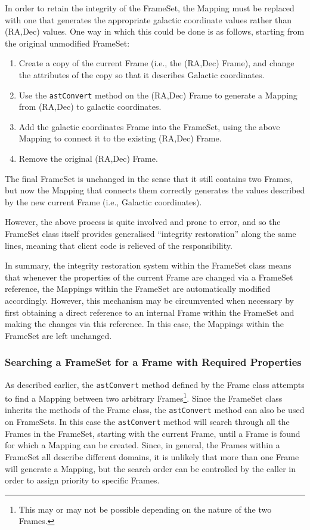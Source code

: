 \documentclass[final,authoryear,5p,times,twocolumn]{elsarticle}
\begin{document}
In order to retain the integrity of the FrameSet, the Mapping must
be replaced with one that generates the appropriate galactic coordinate
values rather than (RA,Dec) values. One way in which this could be done is as
follows, starting from the original unmodified FrameSet:

\begin{enumerate}
\item Create a copy of the current Frame (i.e., the (RA,Dec) Frame), and
change the attributes of the copy so that it describes Galactic
coordinates.
\item Use the \texttt{astConvert} method on the (RA,Dec) Frame to generate a
Mapping from (RA,Dec) to galactic coordinates.
\item Add the galactic coordinates Frame into the FrameSet, using the
above Mapping to connect it to the existing (RA,Dec) Frame.
\item Remove the original (RA,Dec) Frame.
\end{enumerate}

The final FrameSet is unchanged in the sense that it still contains two
Frames, but now the Mapping that connects them correctly generates the values
described by the new current Frame (i.e., Galactic coordinates).

However, the above process is quite involved and prone to error, and so
the FrameSet class itself provides generalised ``integrity restoration''
along the same lines, meaning that client code is relieved of the
responsibility.

In summary, the integrity restoration system within the FrameSet class
means that whenever the properties of the current Frame are changed via a
FrameSet reference, the Mappings within the FrameSet are automatically
modified accordingly. However, this mechanism may be circumvented when
necessary by first obtaining a direct reference to an internal Frame
within the FrameSet and making the changes via this reference. In this
case, the Mappings within the FrameSet are left unchanged.

\subsubsection{Searching a FrameSet for a Frame with Required Properties}
As described earlier, the \texttt{astConvert} method defined by the Frame
class attempts to find a Mapping between two arbitrary
Frames\footnote{This may or may not be possible depending on the nature
of the two Frames.}. Since the FrameSet class inherits the methods of the
Frame class, the \texttt{astConvert} method can also be used on FrameSets. In
this case the \texttt{astConvert} method will search through all the Frames
in the FrameSet, starting with the current Frame, until a Frame is found
for which a Mapping can be created. Since, in general, the Frames within a
FrameSet all describe different domains, it is unlikely that more than one
Frame will generate a Mapping, but the search order can be controlled by
the caller in order to assign priority to specific Frames.
\end{document}
